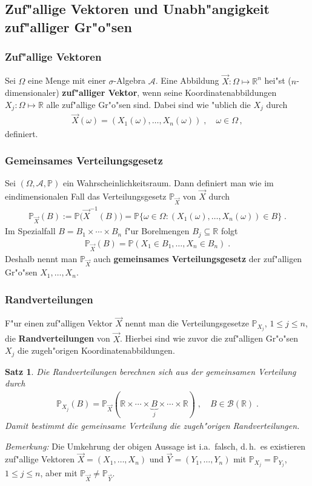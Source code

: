\documentclass[ngerman,draft,parskip=half,twoside]{scrartcl}
\newtheorem{thm}{Satz}[section]
\newcommand*{\R}{\mathbb{R}}      %
\newcommand*{\Algeb}{\mathcal{A}}   %
\newcommand*{\BorelM}{\mathcal{B}}  %
\newcommand*{\WKM}{\mathbb{P}}      %
\begin{document}
\subsection{Zuf"allige Vektoren und Unabh"angigkeit zuf"alliger Gr"o"sen}
\subsubsection{Zuf"allige Vektoren}
Sei $\Omega$ eine Menge mit einer $\sigma$-Algebra $\Algeb$. Eine Abbildung $\vec X \colon \Omega\mapsto\R^n$
hei"st ($n$-dimensionaler) \textbf{zuf"alliger Vektor}, wenn seine Koordinatenabbildungen
$X_j \colon\Omega\mapsto \R$ alle zuf"allige Gr"o"sen sind. Dabei sind wie "ublich die $X_j$ durch
\begin{gather*}
  \vec X(\omega)=(X_1(\omega),\ldots,X_n(\omega))\;,\quad \omega\in\Omega\,,
\end{gather*}
definiert.

\subsubsection{Gemeinsames Verteilungsgesetz}
Sei $(\Omega,\Algeb,\WKM)$ ein Wahrscheinlichkeitsraum. Dann definiert
man wie im eindimensionalen Fall das Verteilungsgesetz $\WKM_{\vec X}$ von $\vec X$
durch
\begin{gather*}
  \WKM_{\vec X}(B):=\WKM\big(\vec X^{-1}(B)\big)=\WKM\{\omega\in\Omega : (X_1(\omega),\ldots,X_n(\omega))\in B\}\;.
\end{gather*}
Im Spezialfall $B=B_1\times\cdots\times B_n$ f"ur Borelmengen $B_j\subseteq\R$ folgt
\begin{gather*}
  \WKM_{\vec X}(B)=\WKM(X_1\in B_1,\ldots, X_n\in B_n)\;.
\end{gather*}
Deshalb nennt man $\WKM_{\vec X}$ auch \textbf{gemeinsames Verteilungsgesetz} der zuf"alligen
Gr"o"sen $X_1,\ldots,X_n$.
\subsubsection{Randverteilungen}
F"ur einen zuf"alligen Vektor $\vec X$ nennt man die Verteilungsgesetze $\WKM_{X_j}$, $1\le j\le n$,
die \textbf{Randverteilungen} von $\vec X$. Hierbei sind wie zuvor die zuf"alligen Gr"o"sen $X_j$ die
zugeh"origen Koordinatenabbildungen.
\begin{thm}
Die Randverteilungen berechnen sich aus der gemeinsamen Verteilung durch
  \begin{gather*}
    \WKM_{X_j}(B)= \WKM_{\vec X}(\R\times\cdots\times \underbrace{B}_j\times\cdots\times\R)\;,\quad B\in\BorelM(\R)\;.
  \end{gather*}
Damit bestimmt die gemeinsame Verteilung die zugeh"origen Randverteilungen.
\end{thm}
\textit{Bemerkung:} Die Umkehrung der obigen Aussage ist i.a.~falsch, d.\,h.~es existieren zuf"allige
Vektoren $\vec X=(X_1,\ldots,X_n)$ und $\vec Y=(Y_1,\ldots, Y_n)$ mit $\WKM_{X_j}=\WKM_{Y_j}$,
$1\le j\le n$, aber mit $\WKM_{\vec X}\not=\WKM_{\vec Y}$.
\end{document}
